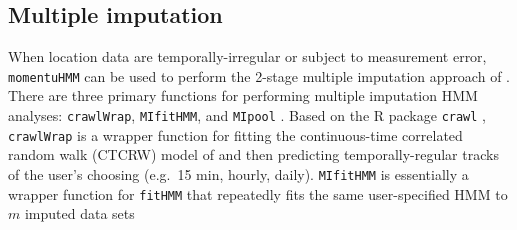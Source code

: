 \documentclass[12pt]{article}\usepackage[]{graphicx}\usepackage[]{color}
\begin{document}
\subsection{Multiple imputation}
\label{sec:mi}
When location data are temporally-irregular or subject to measurement error, %
\verb|momentuHMM| can be used to perform the 2-stage multiple imputation approach of \cite{McClintock2017}. %
There are three primary functions for performing multiple imputation HMM analyses: \verb|crawlWrap|, \verb|MIfitHMM|, and \verb|MIpool|%
. Based on the R package \verb|crawl| \citep{Johnson2017}, \verb|crawlWrap| is a wrapper function for fitting the continuous-time correlated random walk (CTCRW) model of \cite{JohnsonEtAl2008} and then predicting temporally-regular tracks of the user's choosing (e.g.\ 15 min, hourly, daily). %
\verb|MIfitHMM| is essentially a wrapper function for \verb|fitHMM| that repeatedly fits the same user-specified HMM to $m$ imputed data sets%
\end{document}
